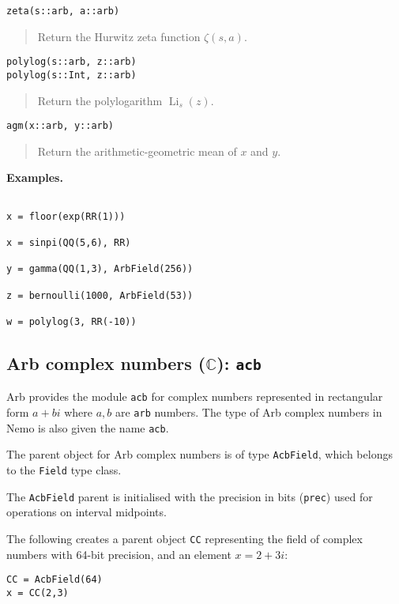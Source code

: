 \documentclass[a4paper,10pt]{article}
\newcommand{\C}{\mathbb{C}}
\newcommand{\code}{\lstinline}
\newcommand{\desc}[1]{\vspace{-3mm}\begin{quote}#1\end{quote}}
\begin{document}
{{\begin{lstlisting}
zeta(s::arb, a::arb)
\end{lstlisting}

\desc{Return the Hurwitz zeta function $\zeta(s,a)$.}

\begin{lstlisting}
polylog(s::arb, z::arb)
polylog(s::Int, z::arb)
\end{lstlisting}

\desc{Return the polylogarithm $\operatorname{Li}_s(z)$.}

\begin{lstlisting}
agm(x::arb, y::arb)
\end{lstlisting}

\desc{Return the arithmetic-geometric mean of $x$ and $y$.}

\textbf{Examples.}

\begin{lstlisting}

x = floor(exp(RR(1)))

x = sinpi(QQ(5,6), RR)

y = gamma(QQ(1,3), ArbField(256))

z = bernoulli(1000, ArbField(53))

w = polylog(3, RR(-10))

\end{lstlisting}

\subsection{Arb complex numbers ($\C$): \code|acb|}

Arb provides the module \code{acb} for complex numbers represented
in rectangular form $a+bi$ where $a,b$ are \code{arb} numbers.
The type of Arb complex numbers in Nemo is also given the name \code{acb}.

The parent object for Arb complex numbers is of type \code{AcbField}, which
belongs to the \code{Field} type class.

The \code{AcbField} parent is initialised with the precision in bits (\code{prec})
used for operations on interval midpoints.

The following creates a parent object \code{CC} representing
the field of complex numbers with 64-bit precision, and an
element $x = 2+3i$:

\begin{lstlisting}
CC = AcbField(64)
x = CC(2,3)
\end{lstlisting}

}}
\end{document}

